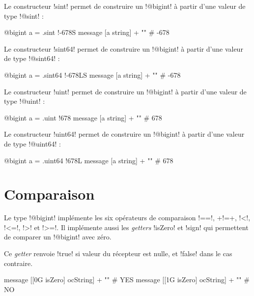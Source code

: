 Le constructeur \ggs!sint! permet de construire un \ggs!@bigint! à partir d'une valeur de type \ggs!@sint! :
\begin{galgas}
@bigint a = .sint {!-678S}
message [a string] + "\n" # -678
\end{galgas}



Le constructeur \ggs!sint64! permet de construire un \ggs!@bigint! à partir d'une valeur de type \ggs!@sint64! :
\begin{galgas}
@bigint a = .sint64 {!-678LS}
message [a string] + "\n" # -678
\end{galgas}





Le constructeur \ggs!uint! permet de construire un \ggs!@bigint! à partir d'une valeur de type \ggs!@uint! :
\begin{galgas}
@bigint a = .uint {!678}
message [a string] + "\n" # 678
\end{galgas}





Le constructeur \ggs!uint64! permet de construire un \ggs!@bigint! à partir d'une valeur de type \ggs!@uint64! :
\begin{galgas}
@bigint a = .uint64 {!678L}
message [a string] + "\n" # 678
\end{galgas}










\section{Comparaison}

Le type \ggs!@bigint! implémente les six opérateurs de comparaison \ggs!==!, \ggs+!=+, \ggs!<!, \ggs!<=!, \ggs!>! et \ggs!>=!. Il  implémente aussi les \emph{getters} \ggs!isZero! et \ggs!sign! qui permettent de comparer un \ggs!@bigint! avec zéro.



Ce \emph{getter} renvoie \ggs!true! si valeur du récepteur est nulle, et \ggs!false! dans le cas contraire.

\begin{galgas}
message [[0G isZero] ocString] + "\n" # YES
message [[1G isZero] ocString] + "\n" # NO
\end{galgas}



